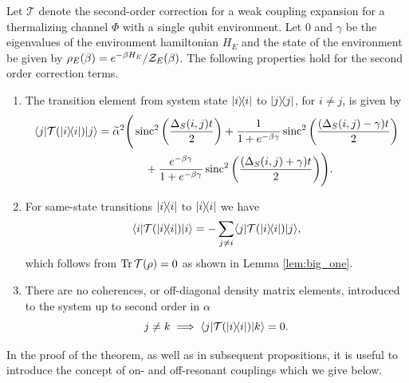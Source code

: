 \begin{theorem} \label{thm:second_order_transition}
Let $\mathcal{T}$ denote the second-order correction for a weak coupling expansion for a thermalizing channel $\Phi$ with a single qubit environment. Let 0 and $\gamma$ be the eigenvalues of the environment hamiltonian $H_E$ and the state of the environment be given by $\rho_E(\beta) = e^{-\beta H_E} / \mathcal{Z}_E(\beta)$. The following properties hold for the second order correction terms.
\begin{enumerate}
    \item 
The transition element from system state $| i\rangle\! \langle i|$ to $| j\rangle\! \langle j|$, for $i \neq j$, is given by
\begin{align}
    \langle j|\mathcal{T}(| i\rangle\! \langle i|) |j\rangle = \widetilde{\alpha}^2 \Biggr(& \operatorname{sinc}^2 \left( \frac{\Delta_S(i,j)t}{2} \right) + \frac{1}{1 + e^{-\beta \gamma}} \operatorname{sinc}^2 \left( \frac{(\Delta_S(i,j) - \gamma)t}{2} \right) \nonumber\\
    &\quad+  \frac{e^{-\beta \gamma}}{1 + e^{-\beta \gamma}} \operatorname{sinc}^2 \left( \frac{(\Delta_S(i,j) + \gamma)t}{2} \right) \Biggr). \label{eq:transition_terms_total}
\end{align}
\item For same-state transitions $| i\rangle\! \langle i|$ to $| i\rangle\! \langle i|$ we have
\begin{equation}
    \langle i|\mathcal{T}(| i\rangle\! \langle i|)|i\rangle = - \sum_{j \neq i} \langle j| \mathcal{T}(| i\rangle\! \langle i|) |j\rangle,
\end{equation}
which follows from $\operatorname{Tr} \mathcal{T}(\rho) = 0$ as shown in Lemma \ref{lem:big_one}. 
\item There are no coherences, or off-diagonal density matrix elements, introduced to the system up to second order in $\alpha$
\begin{equation}
    j \neq k \implies \langle j| \mathcal{T}(| i\rangle\! \langle i|) |k\rangle = 0.
\end{equation}

\end{enumerate}
\end{theorem}
In the proof of the theorem, as well as in subsequent propositions, it is useful to introduce the concept of on- and off-resonant couplings which we give below.
